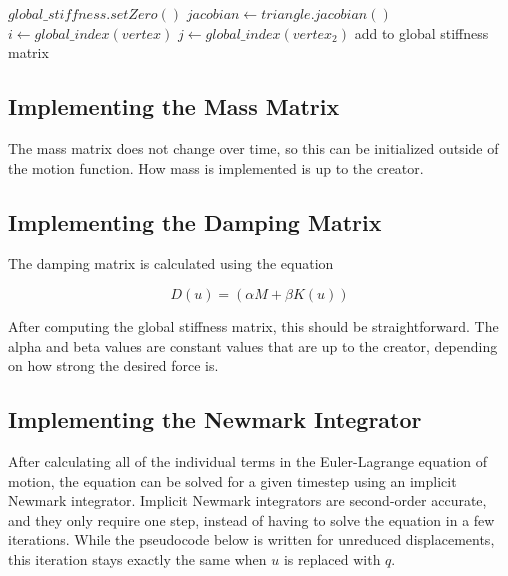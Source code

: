 \documentclass[twocolumn,10pt]{asme2ej}
\begin{document}
\begin{algorithmic}[1]
        \State $global\_stiffness.setZero()$
         \State $jacobian \gets triangle.jacobian()$
                  \State $i \gets global\_index(vertex)$
                          \State $j \gets global\_index(vertex_2)$
                          \State add to global stiffness matrix
                      \EndIf
                    \EndFor
              \EndIf
            \EndFor
        \EndFor
    \EndFunction
\end{algorithmic}

\subsection{Implementing the Mass Matrix}

The mass matrix does not change over time, so this can be initialized outside of the motion function. How mass is implemented is up to the creator.

\subsection{Implementing the Damping Matrix}

The damping matrix is calculated using the equation

\begin{equation}
D(u) = (\alpha M + \beta K(u))
\label{eq_damp}
\end{equation}

After computing the global stiffness matrix, this should be straightforward. The alpha and beta values are constant values that are up to the creator, depending on how strong the desired force is.

\subsection{Implementing the Newmark Integrator}

After calculating all of the individual terms in the Euler-Lagrange equation of motion, the equation can be solved for a given timestep using an implicit Newmark integrator. Implicit Newmark integrators are second-order accurate, and they only require one step, instead of having to solve the equation in a few iterations. While the pseudocode below is written for unreduced displacements, this iteration stays exactly the same when $u$ is replaced with $q$.
\end{document}
